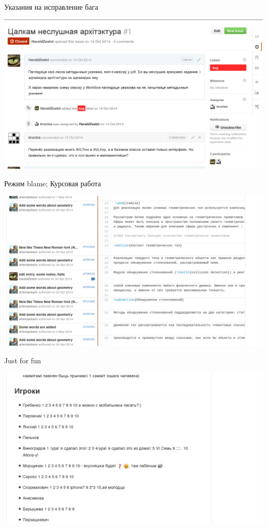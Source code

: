 \documentclass[xetex,14pt,serif,compress,hyperref={xetex}]{beamer}
\begin{document}
\begin{frame}{Указания на исправление бага}
\begin{center}
\includegraphics[scale=0.4,keepaspectratio]{snp42.png}
\end{center}
\end{frame}

\begin{frame}{Режим blame; Курсовая работа}
\begin{center}
\includegraphics[scale=0.4,keepaspectratio]{snp45.png}
\end{center}
\end{frame}

\begin{frame}{Just for fun}
\begin{center}
\includegraphics[scale=0.4,keepaspectratio]{snp43.png}
\end{center}
\end{frame}
\end{document}
